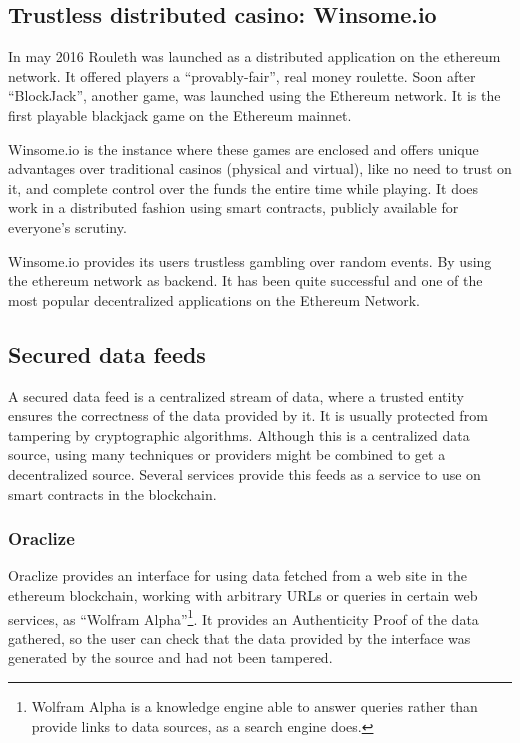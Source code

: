 \subsection{Trustless distributed casino: Winsome.io}

In may 2016 Rouleth \cite{winsomeio} was launched as a distributed application
  on the ethereum network.
It offered players a ``provably-fair'', real money roulette.
Soon after ``BlockJack'', another game,  was launched using the Ethereum
  network.
It is the first playable blackjack game on the Ethereum mainnet.

Winsome.io is the instance where these games are enclosed and offers unique
  advantages over traditional casinos (physical and virtual), like no need to
  trust on it, and complete control over the funds the entire time while
  playing.
It does work in a distributed fashion using smart contracts, publicly available
  for everyone's scrutiny.

Winsome.io provides its users trustless gambling over random events.
By using the ethereum network as backend.
It has been quite successful and one of the most popular decentralized
  applications on the Ethereum Network.

\subsection{Secured data feeds}
A secured data feed is a centralized stream of data, where a trusted entity
  ensures the correctness of the data provided by it.
It is usually protected from tampering by cryptographic algorithms.
Although this is a centralized data source, using many techniques or providers
  might be combined to get a decentralized source.
Several services provide this feeds as a service to use on smart contracts in
  the blockchain.

\subsubsection{Oraclize}
Oraclize \cite{oraclizeit} provides an interface for using data fetched from a
  web site in the ethereum blockchain, working with arbitrary URLs or queries
  in certain web services, as ``Wolfram Alpha''\footnote{Wolfram Alpha is a
  knowledge engine able to answer queries rather than provide links to data
  sources, as a search engine does.}.
It provides an Authenticity Proof of the data gathered, so the user can check
  that the data provided by the interface was generated by the source and had
  not been tampered.

